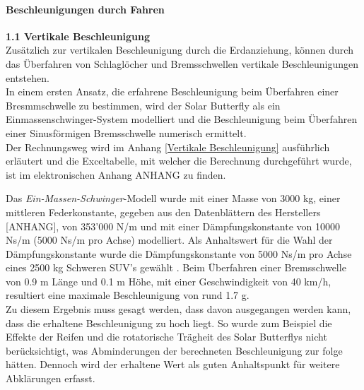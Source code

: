   \paragraph{Beschleunigungen durch Fahren}
  \begin{description}
    \item \textbf{1.1 Vertikale Beschleunigung}\\
    Zusätzlich zur vertikalen Beschleunigung durch die Erdanziehung, können durch das Überfahren von Schlaglöcher und Bremsschwellen vertikale Beschleunigungen entstehen.\\
    In einem ersten Ansatz, die erfahrene Beschleunigung beim Überfahren einer Bresmmschwelle zu bestimmen, wird der Solar Butterfly als ein Einmassenschwinger-System modelliert und die Beschleunigung beim Überfahren einer Sinusförmigen Bremsschwelle numerisch ermittelt.\\
    Der Rechnungsweg wird im Anhang \ref{Vertikale Beschleunigung} ausführlich erläutert und die Exceltabelle, mit welcher die Berechnung durchgeführt wurde, ist im elektronischen Anhang ANHANG zu finden.

    Das \emph{Ein-Massen-Schwinger}-Modell wurde mit einer Masse von 3000 kg, einer mittleren Federkonstante, gegeben aus den Datenblättern des Herstellers [ANHANG], von 353'000 N/m und mit einer Dämpfungskonstante von 10000 Ns/m (5000 Ns/m pro Achse) modelliert. Als Anhaltswert für die Wahl der Dämpfungskonstante wurde die Dämpfungskonstante von 5000 Ns/m pro Achse eines 2500 kg Schweren SUV's gewählt \cite{Beschl.2}. Beim Überfahren einer Bremsschwelle von 0.9 m Länge und 0.1 m Höhe, mit einer Geschwindigkeit von 40 km/h, resultiert eine maximale Beschleunigung von rund 1.7 g.\\
    Zu diesem Ergebnis muss gesagt werden, dass davon ausgegangen werden kann, dass die erhaltene Beschleunigung zu hoch liegt. So wurde zum Beispiel die Effekte der Reifen und die rotatorische Trägheit des Solar Butterflys nicht berücksichtigt, was Abminderungen der berechneten Beschleunigung zur folge hätten. Dennoch wird der erhaltene Wert als guten Anhaltspunkt für weitere Abklärungen erfasst.


\end{description}
